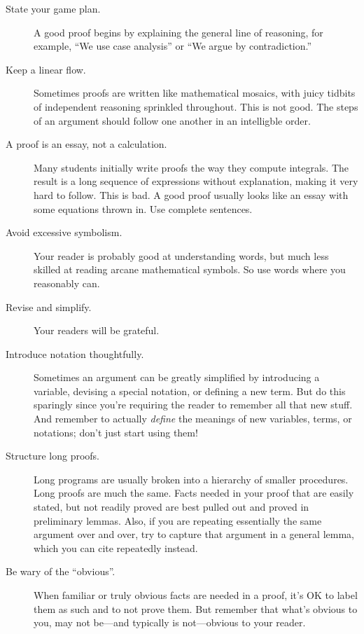 \begin{description}

\item[State your game plan.]  A good proof begins by explaining the
  general line of reasoning, for example, ``We use case analysis'' or ``We
  argue by contradiction.''

\item[Keep a linear flow.]  Sometimes proofs are written like mathematical
  mosaics, with juicy tidbits of independent reasoning sprinkled
  throughout.  This is not good.  The steps of an argument should follow
  one another in an intelligble order.

\item[A proof is an essay, not a calculation.]  Many students initially
  write proofs the way they compute integrals.  The result is a long
  sequence of expressions without explanation, making it very hard to
  follow.  This is bad.  A good proof usually looks like an essay with
  some equations thrown in.  Use complete sentences.

\item[Avoid excessive symbolism.]  Your reader is probably good at
understanding words, but much less skilled at reading arcane
mathematical symbols.  So use words where you reasonably can.

\item[Revise and simplify.]  Your readers will be grateful.

\item[Introduce notation thoughtfully.]  Sometimes an argument can be
greatly simplified by introducing a variable, devising a special
notation, or defining a new term.  But do this sparingly since you're
requiring the reader to remember all that new stuff.  And remember to
actually \textit{define} the meanings of new variables, terms, or
notations; don't just start using them!

\item[Structure long proofs.]  Long programs are usually broken into a
hierarchy of smaller procedures.  Long proofs are much the same.
Facts needed in your proof that are easily stated, but not readily
proved are best pulled out and proved in preliminary lemmas.  Also, if
you are repeating essentially the same argument over and over, try to
capture that argument in a general lemma, which you can cite
repeatedly instead.

\item[Be wary of the ``obvious''.]  When familiar or truly obvious facts
  are needed in a proof, it's OK to label them as such and to not prove
  them.  But remember that what's obvious to you, may not be---and
  typically is not---obvious to your reader.


\end{description}
